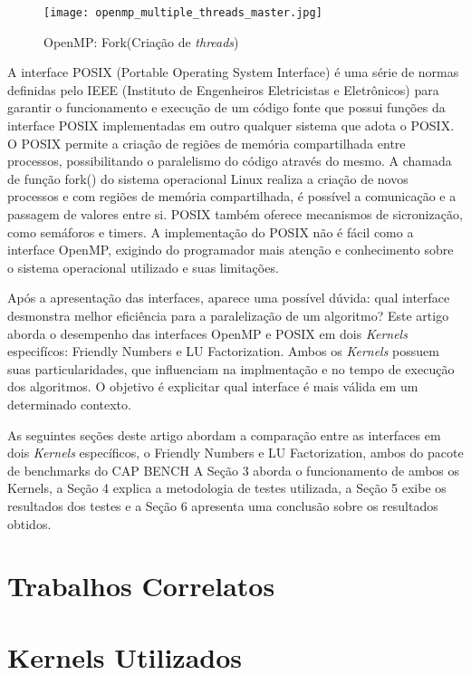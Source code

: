 \documentclass[12pt]{article}
\begin{document}
\begin{figure}[h!]
  \centering
  \texttt{[image: openmp\_multiple\_threads\_master.jpg]}
  \caption{OpenMP: Fork(Criação de \textit{threads})}
  \label{fig:master_thread}
\end{figure}


A interface POSIX (Portable Operating System Interface) é uma série de normas definidas pelo IEEE (Instituto de Engenheiros Eletricistas e Eletrônicos) para garantir o funcionamento e execução de um código fonte que possui funções da interface POSIX implementadas em outro qualquer sistema que adota o POSIX. O POSIX permite a criação de regiões de memória compartilhada entre processos, possibilitando o paralelismo do código através do mesmo. A chamada de função fork() do sistema operacional Linux realiza a criação de novos processos e com regiões de memória compartilhada, é possível a comunicação e a passagem de valores entre si. POSIX também oferece mecanismos de sicronização, como semáforos e timers. A implementação do POSIX não é fácil como a interface OpenMP, exigindo do programador mais atenção e conhecimento sobre o sistema operacional utilizado e suas limitações.

Após a apresentação das interfaces, aparece uma possível dúvida: qual interface desmonstra melhor eficiência para a paralelização de um algoritmo? Este artigo aborda o desempenho das interfaces OpenMP e POSIX em dois \textit{Kernels} especifícos: Friendly Numbers e LU Factorization. Ambos os \textit{Kernels} possuem suas particularidades, que influenciam na implmentação e no tempo de execução dos algoritmos. O objetivo é explicitar qual interface é mais válida em um determinado contexto.

As seguintes seções deste artigo abordam a comparação entre as interfaces em dois \textit{Kernels} específicos, o Friendly Numbers e LU Factorization, ambos do pacote de benchmarks do CAP BENCH A Seção 3 aborda o funcionamento de ambos os Kernels, a Seção 4 explica a metodologia de testes utilizada, a Seção 5 exibe os resultados dos testes e a Seção 6 apresenta uma conclusão sobre os resultados obtidos. 


\section{Trabalhos Correlatos}

\section{Kernels Utilizados}
\end{document}
